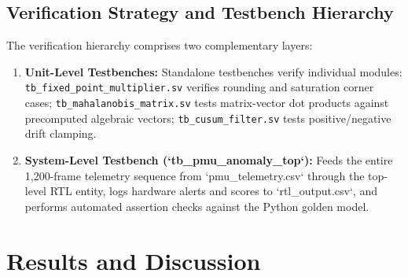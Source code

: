 \documentclass[12pt,a4paper]{report}
\begin{document}
\section{Verification Strategy and Testbench Hierarchy}
The verification hierarchy comprises two complementary layers:
\begin{enumerate}
    \item \textbf{Unit-Level Testbenches:} Standalone testbenches verify individual modules:
    \texttt{tb\_fixed\_point\_multiplier.sv} verifies rounding and saturation corner cases;
    \texttt{tb\_mahalanobis\_matrix.sv} tests matrix-vector dot products against precomputed
    algebraic vectors; \texttt{tb\_cusum\_filter.sv} tests positive/negative drift clamping.
    \item \textbf{System-Level Testbench (`tb\_pmu\_anomaly\_top`):} Feeds the entire 1,200-frame
    telemetry sequence from `pmu_telemetry.csv` through the top-level RTL entity, logs hardware
    alerts and scores to `rtl_output.csv`, and performs automated assertion checks against the
    Python golden model.
\end{enumerate}


\chapter{Results and Discussion}
\end{document}
